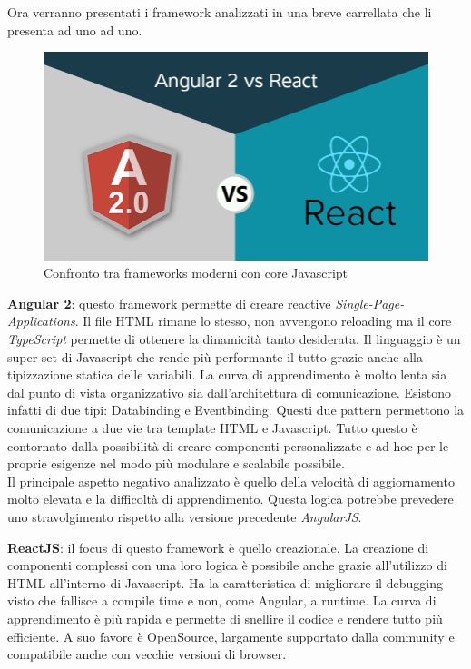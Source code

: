 \documentclass[a4paper]{article}
\begin{document}
\par Ora verranno presentati i framework analizzati in una breve carrellata che li
presenta ad uno ad uno.
\begin{figure}[H]
	\includegraphics[width=\textwidth]{frameworks.png}
	\centering
	\caption{Confronto tra frameworks moderni con core Javascript}
\end{figure}
\par \textbf{Angular 2}: questo framework permette di creare reactive \emph{Single-Page-Applications}.
Il file HTML rimane lo stesso, non avvengono reloading ma il core \emph{TypeScript} permette di 
ottenere la dinamicità tanto desiderata. Il linguaggio è un super set di Javascript che rende più
performante il tutto grazie anche alla tipizzazione statica delle variabili. La curva di 
apprendimento è molto lenta sia dal punto di vista organizzativo sia dall'architettura di 
comunicazione. Esistono infatti di due tipi: Databinding e Eventbinding. Questi due pattern
permettono la comunicazione a due vie tra template HTML e Javascript. Tutto questo è
contornato dalla possibilità di creare componenti personalizzate e ad-hoc per le proprie esigenze
nel modo più modulare e scalabile possibile.\\ 
Il principale aspetto negativo analizzato è quello della velocità di aggiornamento molto elevata
e la difficoltà di apprendimento. Questa logica potrebbe prevedere uno stravolgimento rispetto 
alla versione precedente \emph{AngularJS}.
\par \textbf{ReactJS}: il focus di questo framework è quello creazionale. La creazione di componenti
complessi con una loro logica è possibile anche grazie all'utilizzo di HTML all'interno di Javascript.
Ha la caratteristica di migliorare il debugging visto che fallisce a compile time e non, come Angular,
a runtime. La curva di apprendimento è più rapida e permette di snellire il codice e rendere tutto più
efficiente. A suo favore è OpenSource, largamente supportato dalla community e compatibile anche con 
vecchie versioni di browser.
\end{document}
